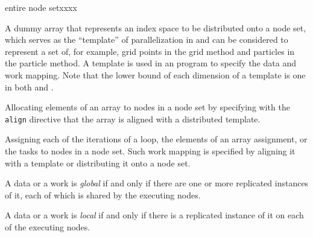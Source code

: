 \begin{namelist}{entire node setxxxx}

 A dummy array that represents an index space to be distributed onto a
 node set, which serves as the ``template'' of parallelization in
 {\XMP} and can be considered to represent a set of, for example, grid
 points in the grid method and particles in the particle method.
%
 A template is used in an {\XMP} program to specify the data and work
 mapping.
%
 Note that the lower bound of each dimension of a template is one in
 both {\XMPF} and {\XMPC}.



 Allocating elements of an array to nodes in a node set by specifying
 with the {\tt align} directive that the array is aligned with a
 distributed template.



 Assigning each of the iterations of a loop, the elements of an array
 assignment, or the tasks to nodes in a node set. Such work mapping is
 specified by aligning it with a template or distributing it onto a
 node set.

%


 A data or a work is {\it global} if and only if there are one or more
 replicated instances of it, each of which is shared by the executing
 nodes.


 A data or a work is {\it local} if and only if there is a replicated
 instance of it on each of the executing nodes.



\end{namelist}
